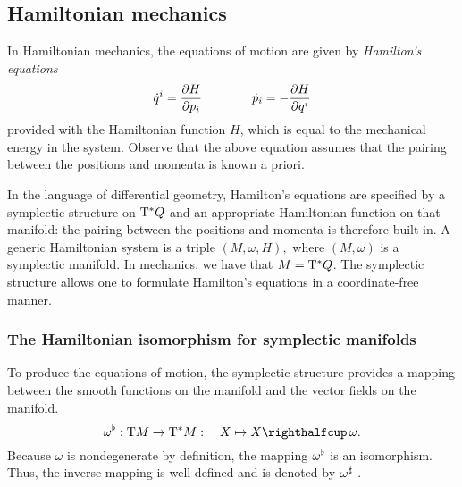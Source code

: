 \subsection{Hamiltonian mechanics}
\label{ssec:symplectic_ham_systems}
In Hamiltonian mechanics, the equations of motion are given by \emph{Hamilton's equations}
\begin{equation}
     \dot{q}^i = \pdv{H}{p_i} \qquad\qquad \dot{p}_i = -\pdv{H}{q^i}
     \label{eq:hamilton_equations}
\end{equation}
provided with the Hamiltonian function \(H\), which is equal to the mechanical energy in the system. Observe that the above equation assumes that the pairing between the positions and momenta is known a priori. 

In the language of differential geometry, Hamilton's equations are specified by a symplectic structure on \(\mathrm{T}^*Q\) and an appropriate Hamiltonian function on that manifold: the pairing between the positions and momenta is therefore built in. A generic Hamiltonian system is a triple \( (M, \omega, H), \) where \( (M, \omega) \) is a symplectic manifold. In mechanics, we have that \( M = \mathrm{T}^*Q \). The symplectic structure allows one to formulate Hamilton's equations in a coordinate-free manner.

\subsubsection{The Hamiltonian isomorphism for symplectic manifolds}
To produce the equations of motion, the symplectic structure provides a mapping between the smooth functions on the manifold and the vector fields on the manifold.%
\begin{equation}
    \toDual{\omega}: \tbundle{M} \to \ctbundle{M}:\quad X \mapsto \intpr{X}{\omega}. 
    \label{eq:symplectic_isomorphism}
\end{equation}
Because \(\omega\) is nondegenerate by definition, the mapping \(\omega^\flat\) is an isomorphism. Thus, the inverse mapping is well-defined and is denoted by \(\omega^\sharp\) \cite{Libermann1987}.

